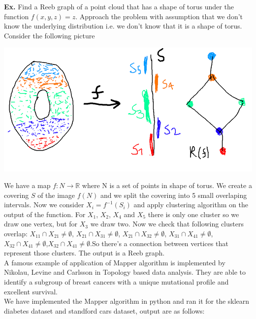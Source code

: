 \documentclass[]{article}
\newcommand{\R}{\mathbb{R}}
\begin{document}
\textbf{Ex.} Find a Reeb graph of a point cloud that has a shape of torus under the function $f(x,y,z) = z$. Approach the problem with assumption that we don't know the underlying distribution i.e. we don't know that it is a shape of torus. \\
Consider the following picture
\begin{center}
\includegraphics[width=1.0\textwidth]{mapper.png}
\end{center}
We have a map $f:N\to \R$ where N is a set of points in shape of torus.
We create a covering $S$ of the image $f(N)$ and we split the covering into 5 small overlaping intervals.
Now we consider $X_i = f^{-1}(S_i)$ and apply clustering algorithm on the output of the function.
For $X_1$, $X_2$, $X_4$ and $X_5$ there is only one cluster so we draw one vertex, but for $X_3$ we draw two.
Now we check that following clusters overlap: $X_{11} \cap X_{21} \neq \emptyset $, $X_{21} \cap X_{31} \neq \emptyset $, $X_{21} \cap X_{32} \neq \emptyset $, $X_{31} \cap X_{41} \neq \emptyset $,$X_{32} \cap X_{41} \neq \emptyset $,$X_{32} \cap X_{41} \neq \emptyset $.So there's a connection between vertices that represent those clusters. The output is a Reeb graph. \\ 
A famous example of application of Mapper algorithm is implemented by Nikolau, Levine and Carlsson in Topology based data analysis. They are able to identify a subgroup of breast cancers with a unique mutational profile and excellent survival.\\

We have implemented the Mapper algorithm in python and ran it for the sklearn diabetes dataset and standford cars dataset, output are as follows:
\end{document}

